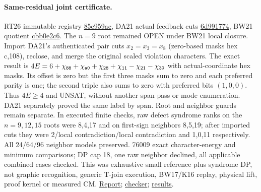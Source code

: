 \documentclass[11pt]{article}
\begin{document}
\paragraph{Same-residual joint certificate.} RT26 immutable registry \href{https://github.com/j15marti/pnp/commit/85e959ac861572a2411b9858da0d58d7c72ac780}{85e959ac}, DA21 actual feedback cuts \href{https://github.com/j15marti/pnp/commit/6d9917749c8438435d889b31e5c81ed0fc410e9a}{6d991774}, BW21 quotient \href{https://github.com/j15marti/pnp/commit/cbb0e2c61e3114ca9ba20a36f09018380724949d}{cbb0e2c6}. The $n=9$ root remained OPEN under BW21 local closure. Import DA21's authenticated pair cuts $x_2=x_3=x_8$ (zero-based masks hex c,108), reclose, and merge the original scaled violation characters. The exact result is $4E=6+\chi_{\tt88}+\chi_{\tt a0}+\chi_{\tt28}+\chi_{\tt11}-\chi_{\tt21}-\chi_{\tt30}$ with actual-coordinate hex masks. Its offset is zero but the first three masks sum to zero and each preferred parity is one; the second triple also sums to zero with preferred bits $(1,0,0)$. Thus $4E\ge4$ and UNSAT, without another span pass or mode enumeration. DA21 separately proved the same label by span. Root and neighbor guards remain separate. In executed finite checks, raw defect syndrome ranks on the $n=9,12,15$ roots were 8,4,17 and on first-sign neighbors 8,5,19; after imported cuts they were 2/local contradiction/local contradiction and 1,0,11 respectively. All 24/64/96 neighbor models preserved. 76009 exact character-energy and minimum comparisons; DP cap 18, one raw neighbor declined, all applicable combined cases checked. This was exhaustive small reference plus syndrome DP, not graphic recognition, generic T-join execution, BW17/K16 replay, physical lift, proof kernel or measured CM. \href{https://github.com/j15marti/pnp/commit/ec26bf8f2a6c5d3403ba6c508cf49cb2e0a713a6}{Report}; \href{https://github.com/j15marti/pnp/commit/08d12457cd2580072711227494220934a7f4951e}{checker}; \href{https://github.com/j15marti/pnp/commit/d56f2847856f242ebd66844ec5f1c3e7e9d62121}{results}.
\end{document}
